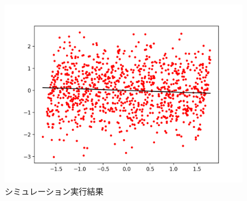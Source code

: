 \documentclass[11pt,a4paper,dvipdfmx]{article}
\theoremstyle{plain}
\newcommand{\1}{\mbox{1}\hspace{-0.25em}\mbox{l}}
\begin{document}
\begin{figure}[H]
  \centering
    \includegraphics[height=8cm]{image/newton.png}
    \caption{\footnotesize シミュレーション実行結果}
\end{figure}
\end{document}
